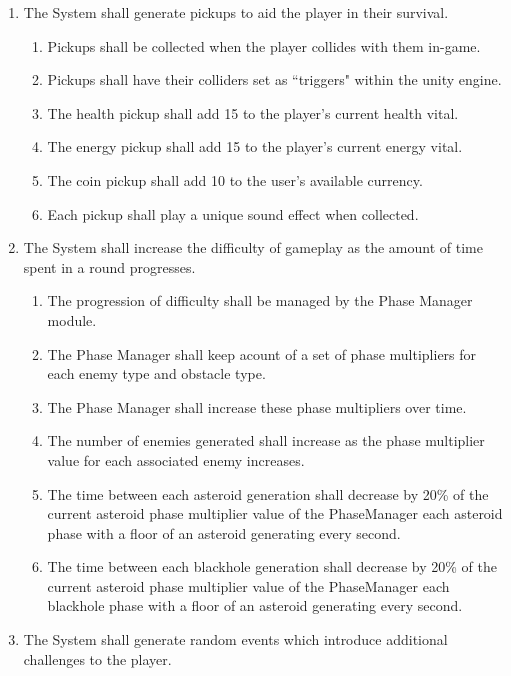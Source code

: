 \documentclass[12pt]{report}
\newenvironment{reqlist}{
	\renewcommand{\labelenumi}{\tab\thesubsection.\arabic{enumi}}
	\renewcommand{\labelenumii}{\thesubsection.\arabic{enumi}.\arabic{enumii}}
	\begin{enumerate}[itemsep = 1pt, parsep = 0pt, leftmargin = *]
}{\end{enumerate}}
\begin{document}
\begin{reqlist}
\begin{reqlist}
				\item Type A Enemies shall attempt to dodge the incoming laser fire from the player.
			\end{reqlist}
			\item The System shall generate pickups to aid the player in their survival.
			\begin{reqlist}
				\item Pickups shall be collected when the player collides with them in-game.
				\item Pickups shall have their colliders set as ``triggers" within the unity engine.
				\item The health pickup shall add 15 to the player's current health vital.
				\item The energy pickup shall add 15 to the player's current energy vital.
				\item The coin pickup shall add 10 to the user's available currency.
				\item Each pickup shall play a unique sound effect when collected.
			\end{reqlist}
			\item The System shall increase the difficulty of gameplay as the amount of time spent in a round progresses.
			\begin{reqlist}
				\item The progression of difficulty shall be managed by the Phase Manager module.
				\item The Phase Manager shall keep acount of a set of phase multipliers for each enemy type and obstacle type.
				\item The Phase Manager shall increase these phase multipliers over time.
				\item The number of enemies generated shall increase as the phase multiplier value for each associated enemy increases.
				\item The time between each asteroid generation shall decrease by 20\% of the current asteroid phase multiplier value of the PhaseManager each asteroid phase with a floor of an asteroid generating every second.
				\item The time between each blackhole generation shall decrease by 20\% of the current asteroid phase multiplier value of the PhaseManager each blackhole phase with a floor of an asteroid generating every second.
			\end{reqlist}
			\item The System shall generate random events which introduce additional challenges to the player.

\end{reqlist}
\end{document}
